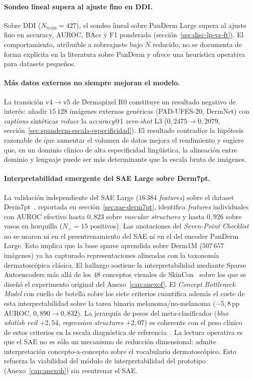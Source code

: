 \paragraph{Sondeo lineal supera al ajuste fino en DDI.}
Sobre DDI ($N_{\mathrm{train}} = 427$), el sondeo lineal sobre PanDerm
Large supera al ajuste fino en accuracy, AUROC, BAcc y F1 ponderada
(sección~\ref{sec:disc-lp-vs-ft}). El comportamiento, atribuible a
sobreajuste bajo $N$ reducido, no se documenta de forma explícita en la
literatura sobre PanDerm y ofrece una heurística operativa para datasets
pequeños.

\paragraph{Más datos externos no siempre mejoran el modelo.}
La transición v4$\to$v5 de Dermapixel R0 constituye un resultado negativo
de interés: añadir $15\,128$ imágenes externas genéricas
(PAD-UFES-20, DermNet) con \emph{captions} sintéticas \emph{reduce} la
\emph{accuracy}@1 \emph{zero-shot} L3 ($0{,}2475 \to 0{,}2079$,
sección~\ref{sec:spanderm-escala-especificidad}). El resultado contradice
la hipótesis razonable de que aumentar el volumen de datos mejora el
rendimiento y sugiere que, en un dominio clínico de alta especificidad
lingüística, la alineación entre dominio y lenguaje puede ser más
determinante que la escala bruta de imágenes.

\paragraph{Interpretabilidad emergente del SAE Large sobre
Derm7pt.}
La validación independiente del SAE Large ($16\,384$
\emph{features}) sobre el dataset Derm7pt~\cite{kawahara2019},
reportada en sección~\ref{sec:sae-derm7pt}, identifica
\emph{features} individuales con AUROC efectivo hasta $0{,}823$
sobre \emph{vascular structures} y hasta $0{,}926$ sobre vasos
en horquilla ($N_{+} = 15$ positivos). Las anotaciones del
\emph{Seven-Point Checklist} no se usaron ni en el preentrenamiento
del SAE ni en el del encoder PanDerm Large. Esto implica que la base
sparse aprendida sobre Derm1M ($507\,657$ imágenes) ya ha
capturado representaciones alineadas con la taxonomía dermatoscópica
clásica. El hallazgo sostiene la interpretabilidad mediante Sparse
Autoencoders más allá de los $48$ conceptos visuales de
SkinCon~\cite{skincon} sobre los que se diseñó el experimento
original del Anexo~\ref{cap:anexof}. El \emph{Concept Bottleneck
Model} con cuello de botella sobre los siete criterios cuantifica
además el coste de esta interpretabilidad sobre la tarea binaria
melanoma/no-melanoma ($-5{,}8$\,pp AUROC, $0{,}890 \to
0{,}832$). La jerarquía de pesos del meta-clasificador
(\emph{blue whitish veil} $+2{,}54$, \emph{regression structures}
$+2{,}07$) es coherente con el peso clínico de estos criterios en
la escala diagnóstica de referencia~\cite{kawahara2019}. La lectura
operativa es que el SAE no es sólo un mecanismo de reducción
dimensional: admite interpretación concepto-a-concepto sobre el
vocabulario dermatoscópico. Esto refuerza la viabilidad del módulo de
interpretabilidad del prototipo (Anexo~\ref{cap:anexoh}) sin
reentrenar el SAE.

